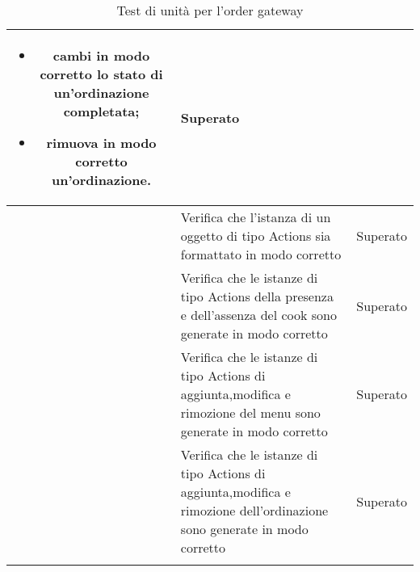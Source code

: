 \begin{longtable}{|c|P{9cm}|c|}
\begin{itemize}
		\item cambi in modo corretto lo stato di un'ordinazione completata;
		\item rimuova in modo corretto un'ordinazione.
	\end{itemize}
	& Superato \\
	\hline{} & Verifica che l'istanza di un oggetto di tipo Actions sia formattato in modo corretto & Superato \\
	\hline{} & Verifica che le istanze di tipo Actions della presenza e dell'assenza del cook sono generate in modo corretto & Superato \\
	\hline{} & Verifica che le istanze di tipo Actions di aggiunta,modifica e rimozione del menu sono generate in modo corretto & Superato \\
	\hline{} & Verifica che le istanze di tipo Actions di aggiunta,modifica e rimozione dell'ordinazione sono generate in modo corretto & Superato \\
	\hline
	\caption{Test di unità per l'order gateway}
\end{longtable}

